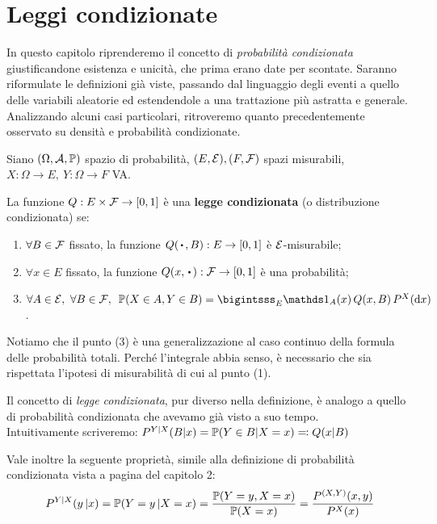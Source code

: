 
\section{Leggi condizionate}
\label{section-leggi-condizionate}
In questo capitolo riprenderemo il concetto di \emph{probabilità condizionata} giustificandone esistenza e unicità, che prima erano date per scontate.
Saranno riformulate le definizioni già viste, passando dal linguaggio degli eventi a quello delle variabili aleatorie ed estendendole a una trattazione più astratta e generale.
Analizzando alcuni casi particolari, ritroveremo quanto precedentemente osservato su densità e probabilità condizionate.
\smallskip
\begin{defn}
  Siano $(\Omega, \mathcal A, \mathbb P)$ spazio di probabilità, $(E, \mathcal E), (F, \mathcal F)$ spazi misurabili, $X: \Omega \to E, \ Y: \Omega \to F$ VA.

  La funzione $Q: E \times \mathcal F \to [0, 1]$ è una \textbf{legge condizionata} (o distribuzione condizionata) se:
  \begin{enumerate}
    \item $\forall B \in \mathcal F$ fissato, la funzione $Q(\, \bigcdot \, , B): E \to [0, 1]$ è $\mathcal E$-misurabile;
    \item $\forall x \in E$ fissato, la funzione $Q(x, \, \bigcdot \,): \Fc \to [0, 1]$ è una probabilità;
    \item $\forall A \in \Ec, \ \forall B \in \Fc, \enspace \PP(X \in A, Y \in B) = \bigintsss_E \Ind_A(x) \, Q(x, B) \, P^X(\dx)$.
  \end{enumerate}
\end{defn}

Notiamo che il punto (3) è una generalizzazione al caso continuo della formula delle probabilità totali. Perché l'integrale abbia senso, è necessario che sia rispettata l'ipotesi di misurabilità di cui al punto (1).

Il concetto di \emph{legge condizionata}, pur diverso nella definizione, è analogo a quello di probabilità condizionata che avevamo già visto a suo tempo. \\ Intuitivamente scriveremo: $P^{Y|X}(B|x) = \mathbb P(Y \in B | X = x) \eqqcolon Q(x|B)$

Vale inoltre la seguente proprietà, simile alla definizione di probabilità condizionata vista a pagina \pageref{prob-condizionata} del capitolo 2:
$$P^{Y|X}(y \,| x) = \mathbb P(Y = y \,| X = x) = \dfrac {\mathbb P(Y=y, X=x)} {\mathbb P(X=x)} = \dfrac {P^{(X, Y)}(x, y)} {P^X(x)}$$

